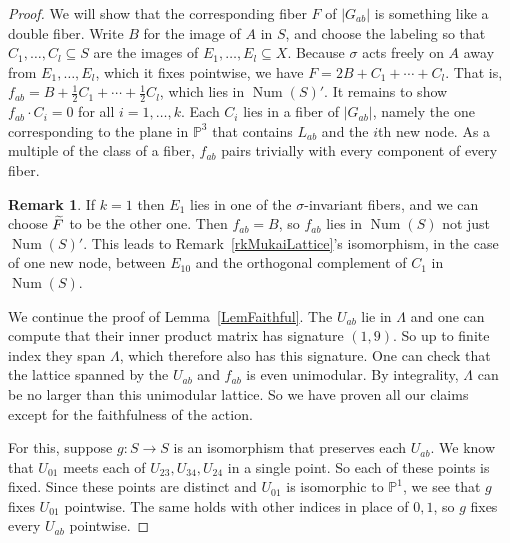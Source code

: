 \documentclass[11pt]{article}
\theoremstyle{definition}
\newtheorem*{rema*}{Remark}
\numberwithin{equation}{section}
\numberwithin{figure}{section}
\numberwithin{table}{section}
\let\oldtilde\tilde
\renewcommand*\tilde[1]{\mathchoice{\widetilde{#1}}{\widetilde{#1}}{\oldtilde{#1}}{\oldtilde{#1}}}
\newcommand*\Ftilde{\tilde F}
\newcommand{\bbP}{{\mathbb{P}}}
\DeclareMathOperator{\Num}{Num}
\begin{document}
\begin{proof}
We will show that the corresponding fiber $F$ of $|G_{ab}|$ is something like a double fiber. Write $B$ for the image of $A$ in $S$, and choose the labeling so that $C_1,\dots,C_l\subseteq S$ are the images of $E_1,\dots,E_l\subseteq X$. Because $\sigma$ acts freely on $A$ away from $E_1,\dots,E_l$, which it fixes pointwise, we have $F=2B+C_1+\cdots+C_l$. That is, $f_{ab}=B+\frac12C_1+\cdots+\frac12C_l$, which lies in $\Num(S)'$. It remains to show $f_{ab}\cdot C_i=0$ for all $i=1,\dots,k$. Each $C_i$ lies in a fiber of $|G_{ab}|$, namely the one corresponding to the plane in $\bbP^3$ that contains $L_{ab}$ and the $i$th new node. As a multiple of the class of a fiber, $f_{ab}$ pairs trivially with every component of every fiber.%
\begin{rema*}
If $k=1$ then $E_1$ lies in one of the $\sigma$-invariant fibers, and we can choose $\Ftilde$ to be the other one. Then $f_{ab}=B$, so $f_{ab}$ lies in $\Num(S)$ not just $\Num(S)'$. This leads to Remark~\ref{rkMukaiLattice}'s isomorphism, in the case of one new node, between $E_{10}$ and the orthogonal complement of $C_1$ in $\Num(S)$.
\end{rema*}

We continue the proof of Lemma~\ref{LemFaithful}. The $U_{ab}$ lie in $\Lambda$ and one can compute that their inner product matrix has signature $(1,9)$. So up to finite index they span $\Lambda$, which therefore also has this signature. One can check that the lattice spanned by the $U_{ab}$ and $f_{ab}$ is even unimodular. By integrality, $\Lambda$ can be no larger than this unimodular lattice. So we have proven all our claims except for the faithfulness of the action.

For this, suppose $g:S\to S$ is an isomorphism that preserves each $U_{ab}$. We know that $U_{01}$ meets each of $U_{23},U_{34},U_{24}$ in a single point. So each of these points is fixed. Since these points are distinct and $U_{01}$ is isomorphic to $\bbP^1$, we see that $g$ fixes $U_{01}$ pointwise. The same holds with other indices in place of $0,1$, so $g$ fixes every $U_{ab}$ pointwise.


\end{proof}
\end{document}
